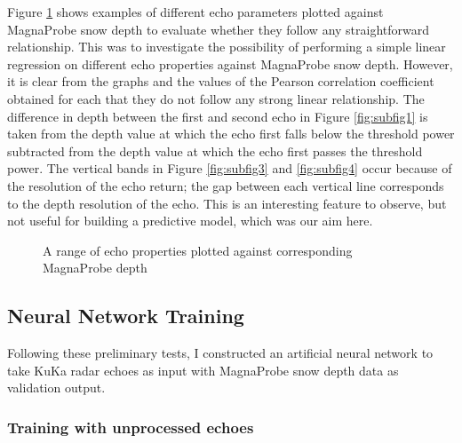 \documentclass[11pt, a4paper]{article}
\begin{document}
Figure \ref{fig:globfig} shows examples of different echo parameters plotted against MagnaProbe snow depth to evaluate whether they follow any straightforward relationship. This was to investigate the possibility of performing a simple linear regression on different echo properties against MagnaProbe snow depth. However, it is clear from the graphs and the values of the Pearson correlation coefficient obtained for each that they do not follow any strong linear relationship. The difference in depth between the first and second echo in Figure \ref{fig:subfig1} is taken from the depth value at which the echo first falls below the threshold power subtracted from the depth value at which the echo first passes the threshold power. The vertical bands in Figure \ref{fig:subfig3} and \ref{fig:subfig4} occur because of the resolution of the echo return; the gap between each vertical line corresponds to the depth resolution of the echo. This is an interesting feature to observe, but not useful for building a predictive model,  which was our aim here. 

\begin{figure}[H]

\qquad
{}
\linebreak
{}
\qquad
{}
\caption{A range of echo properties plotted against corresponding MagnaProbe depth}
\label{fig:globfig}
\end{figure}

\subsection{Neural Network Training}

Following these preliminary tests, I constructed an artificial neural network to take KuKa radar echoes as input with MagnaProbe snow depth data as validation output.

\subsubsection{Training with unprocessed echoes}
\end{document}
